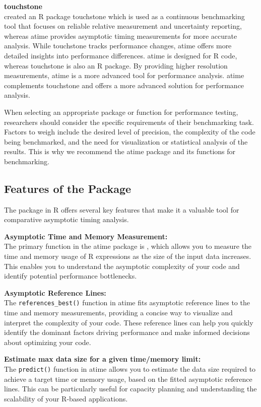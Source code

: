 \textbf{touchstone} \\
\citet{touchstone} created an R package touchstone which is used as a continuous benchmarking tool that focuses on reliable relative measurement and uncertainty reporting, whereas atime provides asymptotic timing measurements for more accurate analysis. While touchstone tracks performance changes, atime offers more detailed insights into performance differences. atime is designed for R code, whereas touchstone is also an R package. By providing higher resolution measurements, atime is a more advanced tool for performance analysis. atime complements touchstone and offers a more advanced solution for performance analysis.

    
\noindent When selecting an appropriate package or function for performance testing, researchers should consider the specific requirements of their benchmarking task. Factors to weigh include the desired level of precision, the complexity of the code being benchmarked, and the need for visualization or statistical analysis of the results. This is why we recommend the atime package and its functions for benchmarking.

\subsection{Features of the Package}
The   package in R offers several key features that make it a valuable tool for comparative asymptotic timing analysis.

\textbf{Asymptotic Time and Memory Measurement:} \\
The primary function in the atime package is , which allows you to measure the time and memory usage of R expressions as the size of the input data increases. This enables you to understand the asymptotic complexity of your code and identify potential performance bottlenecks.
\vspace{0.1in}

\textbf{Asymptotic Reference Lines:} \\
The \texttt{references\_best()} function in atime fits asymptotic reference lines to the time and memory measurements, providing a concise way to visualize and interpret the complexity of your code. These reference lines can help you quickly identify the dominant factors driving performance and make informed decisions about optimizing your code.
\vspace{0.1in}

\textbf{Estimate max data size for a given time/memory limit:} \\
The \texttt{predict()} function in atime allows you to estimate the data size required to achieve a target time or memory usage, based on the fitted asymptotic reference lines. This can be particularly useful for capacity planning and understanding the scalability of your R-based applications.
\vspace{0.1in}

